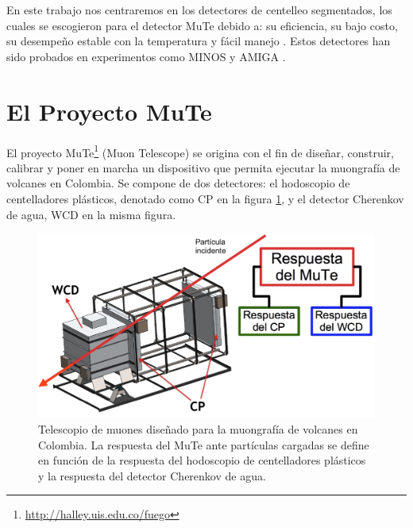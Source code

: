 \documentclass[12pt,oneside,openany,letter]{book}
\begin{document}
En este trabajo nos centraremos en los detectores de centelleo segmentados, los cuales se escogieron para el detector MuTe debido a: su eficiencia, su bajo costo, su desempeño estable con la temperatura y fácil manejo \cite{SuarezDuran2016}. Estos detectores han sido probados en experimentos como MINOS \cite{adamson-etal2002} y AMIGA \cite{amiga-etal2016}. 


\section{El Proyecto MuTe}
El proyecto MuTe\footnote{\url{http://halley.uis.edu.co/fuego}} (Muon Telescope) se origina con el fin de diseñar, construir, calibrar y poner en marcha un dispositivo que permita ejecutar la muongrafía de volcanes en Colombia. Se compone de dos detectores: el hodoscopio de centelladores pl\'asticos, denotado como CP en la figura \ref{mute}, y el detector Cherenkov de agua, WCD en la misma figura. 
\begin{figure}[h!]
    \centering        \includegraphics[scale=0.3]{images/mute.jpg}
\caption[Telescopio de Muones MuTe]{Telescopio de muones diseñado para la muongrafía de volcanes en Colombia. La respuesta del MuTe ante partículas cargadas se define en funci\'on de la respuesta del hodoscopio de centelladores plásticos y la respuesta del detector Cherenkov de agua.}\label{mute}
\end{figure}
\end{document}
